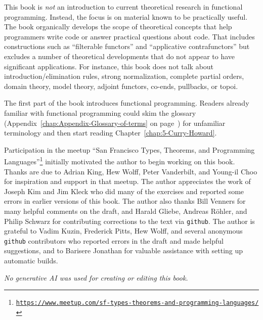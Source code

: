 This book is \emph{not} an introduction to current theoretical research
in functional programming. Instead, the focus is on material known
to be practically useful. The book organically develops the scope
of theoretical concepts that help programmers write code or answer
practical questions about code. That includes constructions such as
\textsf{``}filterable functors\textsf{''} and \textsf{``}applicative contrafunctors\textsf{''} but
excludes a number of theoretical developments that do not appear to
have significant applications. For instance, this book does not talk
about introduction/elimination rules, strong normalization, complete
partial orders, domain theory, model theory, adjoint functors, co-ends,
pullbacks, or topoi.

The first part of the book introduces functional programming. Readers
already familiar with functional programming could skim the glossary
(Appendix~\ref{chap:Appendix-Glossary-of-terms} on page~\pageref{chap:Appendix-Glossary-of-terms})
for unfamiliar terminology and then start reading Chapter~\ref{chap:5-Curry-Howard}. 

Participation in the meetup \textsf{``}San Francisco Types, Theorems, and
Programming Languages\textsf{''}\footnote{\texttt{\href{https://www.meetup.com/sf-types-theorems-and-programming-languages/}{https://www.meetup.com/sf-types-theorems-and-programming-languages/}}}
initially motivated the author to begin working on this book. Thanks
are due to Adrian King, Hew Wolff, Peter Vanderbilt, and Young-il
Choo for inspiration and support in that meetup. The author appreciates
the work of Joseph Kim and Jim Kleck who did many of the exercises
and reported some errors in earlier versions of this book. The author
also thanks Bill Venners for many helpful comments on the draft, and
Harald Gliebe, Andreas R\"ohler, and Philip Schwarz for contributing
corrections to the text via \texttt{github}. The author is grateful
to Vadim Kuzin, Frederick Pitts, Hew Wolff, and several anonymous
\texttt{github} contributors who reported errors in the draft and
made helpful suggestions, and to Barisere Jonathan for valuable assistance
with setting up automatic builds.

\emph{No generative AI was used for creating or editing this book.}


